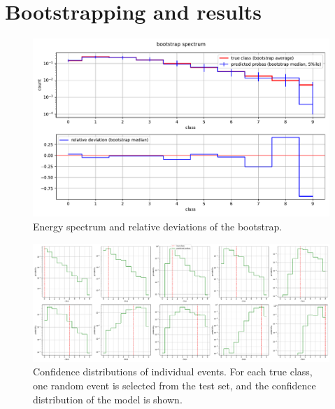 \section{Bootstrapping and results}

\begin{figure}
    \centering
    \includegraphics[width=\textwidth]{content/plots/halftime/bootstrap_spectrum.pdf}
    \caption{Energy spectrum and relative deviations of the bootstrap.}
    \label{fig:bootstrap:spectrum}
\end{figure}


\begin{figure}
    \centering
    \includegraphics[width=\textwidth]{content/plots/halftime/single_events.pdf}
    \caption{
        Confidence distributions of individual events.
        For each true class,
        one random event is selected from the test set,
        and the confidence distribution of the model is shown.
        }
\end{figure}
